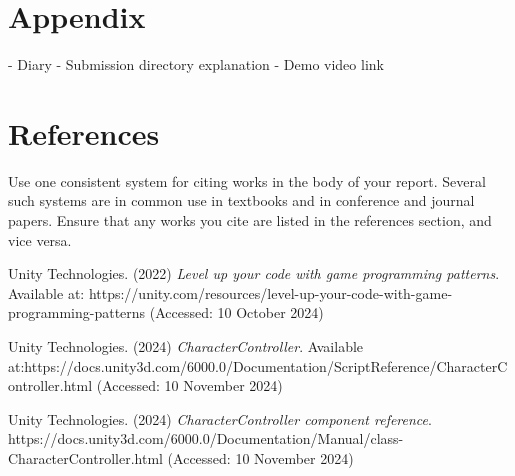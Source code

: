 \documentclass[]{final_report}
\begin{document}
\chapter{Appendix}
- Diary \newline
- Submission directory explanation \newline
- Demo video link\newline
\chapter{References}

Use one consistent system for citing works in the body of your report. Several such systems are in common use in textbooks and in conference and journal papers. Ensure that any works you cite are listed in the references section, and vice versa. 

\newpage
\begin{thebibliography}{99}
\item Unity Technologies. (2022) \textit{Level up your code with game programming patterns}. Available at: https://unity.com/resources/level-up-your-code-with-game-programming-patterns (Accessed: 10 October 2024)
\item Unity Technologies. (2024) \textit{CharacterController}. Available at:https://docs.unity3d.com/6000.0/Documentation/ScriptReference/CharacterController.html (Accessed: 10 November 2024)
\item Unity Technologies. (2024) \textit{CharacterController component reference}. https://docs.unity3d.com/6000.0/Documentation/Manual/class-CharacterController.html (Accessed: 10 November 2024)
\end{thebibliography}
\label{endpage}
\end{document}
